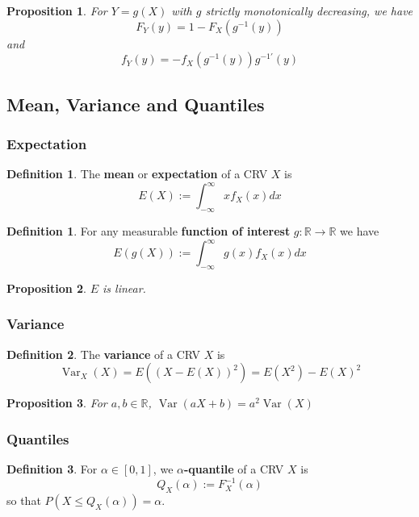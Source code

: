 \documentclass[12pt]{article}
\newtheorem*{prop*}{Proposition}
\theoremstyle{definition}
\newtheorem{defn}{Definition}[subsection]
\newtheorem*{defn*}{Definition}
\newcommand{\R}{\mathbb{R}}
\DeclareMathOperator{\Var}{Var}
\begin{document}
\begin{prop*}
  For $Y = g(X)$ with $g$ strictly monotonically decreasing, we have
  $$F_Y(y) = 1 - F_X(g^{-1}(y))$$
  and
  $$f_Y(y) = -f_X\left(g^{-1}(y)\right)g^{-1'}(y)$$
\end{prop*}

\subsection{Mean, Variance and Quantiles}

\subsubsection{Expectation}

\begin{defn}
  The \textbf{mean} or \textbf{expectation} of a CRV $X$ is
  $$E(X) := \int_{-\infty}^{\infty}xf_X(x)dx$$
\end{defn}

\begin{defn*}
  For any measurable \textbf{function of interest} $g : \R \to \R$ we have
  $$E(g(X)) := \int_{-\infty}^{\infty}g(x)f_X(x)dx$$
\end{defn*}

\begin{prop*}
  $E$ is linear.
\end{prop*}

\subsubsection{Variance}

\begin{defn}
  The \textbf{variance} of a CRV $X$ is
  $$\Var_X(X) = E((X - E(X))^2) = E(X^2) - E(X)^2$$
\end{defn}

\begin{prop*}
  For $a, b \in \R$, $\Var(aX + b) = a^2\Var(X)$
\end{prop*}

\subsubsection{Quantiles}

\begin{defn}
  For $\alpha \in [0, 1]$, we \textbf{$\alpha$-quantile} of a CRV $X$ is
  $$Q_X(\alpha) := F_X^{-1}(\alpha)$$
  so that $P(X \leq Q_X(\alpha)) = \alpha$.
\end{defn}
\end{document}
